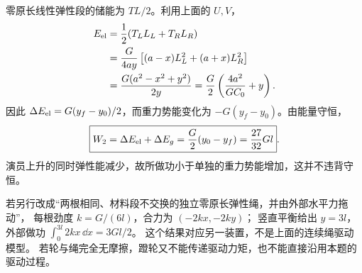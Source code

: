 \begin{xesolution}
零原长线性弹性段的储能为 $TL/2$。利用上面的 $U,V$，
\begin{align*}
 E_{\rm el}&=\frac12(T_LL_L+T_RL_R)\\
 &=\frac{G}{4ay}\left[(a-x)L_L^2+(a+x)L_R^2\right]\\
 &=\frac{G(a^2-x^2+y^2)}{2y}
 =\frac G2\left(\frac{4a^2}{GC_0}+y\right).
\end{align*}
因此 $\Delta E_{\rm el}=G(y_f-y_0)/2$，而重力势能变化为
$-G(y_f-y_0)$。由能量守恒，
\[
 \boxed{W_2=\Delta E_{\rm el}+\Delta E_g
 =\frac G2(y_0-y_f)=\frac{27}{32}Gl}.
\]
演员上升的同时弹性能减少，故所做功小于单独的重力势能增加，这并不违背守恒。

若另行改成“两根相同、材料段不交换的独立零原长弹性绳，并由外部水平力拖动”，
每根劲度 $k=G/(6l)$，合力为 $(-2kx,-2ky)$；
竖直平衡给出 $y=3l$，外部做功
$\int_0^{3l}2kx\,\dd x=3Gl/2$。
这个结果对应另一装置，不是上面的连续绳驱动模型。
若轮与绳完全无摩擦，蹬轮又不能传递驱动力矩，也不能直接沿用本题的驱动过程。
\end{xesolution}

